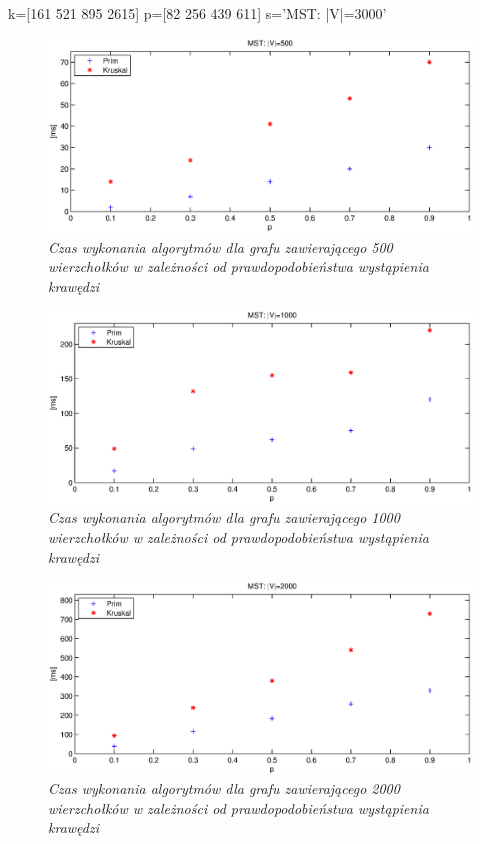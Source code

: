 \documentclass[a4paper, 10pt]{article}
\begin{document}



k=[161 521 895 2615]
p=[82 256 439 611]
s='MST: |V|=3000'


\begin{figure}[ht!]
\centering
\includegraphics[width=165mm]{wykresy/v500.eps}
\caption{\it{Czas wykonania algorytmów dla grafu zawierającego 500 wierzchołków w zależności od prawdopodobieństwa wystąpienia krawędzi}}
\label{overflow}
\end{figure}

\begin{figure}[ht!]
\centering
\includegraphics[width=165mm]{wykresy/v1000.eps}
\caption{\it{Czas wykonania algorytmów dla grafu zawierającego 1000 wierzchołków w zależności od prawdopodobieństwa wystąpienia krawędzi}}
\label{overflow}
\end{figure}

\begin{figure}[ht!]
\centering
\includegraphics[width=165mm]{wykresy/v2000.eps}
\caption{\it{Czas wykonania algorytmów dla grafu zawierającego 2000 wierzchołków w zależności od prawdopodobieństwa wystąpienia krawędzi}}
\label{overflow}
\end{figure}
\end{document}
